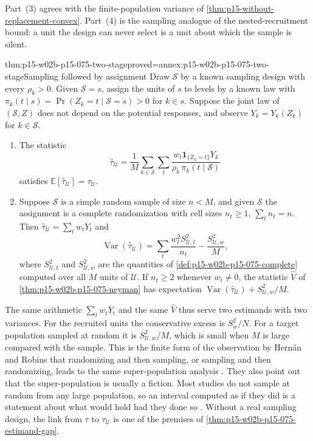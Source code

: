 Part~(3) agrees with the finite-population variance of
\cref{thm:p15-without-replacement-convex}. Part~(4) is the sampling analogue of
the nested-recruitment bound: a unit the design can never select is a unit
about which the sample is silent.

\begin{hbtheorem}{thm:p15-w02b-p15-075-two-stage}{proved=annex:p15-w02b-p15-075-two-stage}{Sampling followed by assignment}
Draw \(\mathcal S\) by a known sampling design with every \(\rho_k>0\).
Given \(\mathcal S=s\), assign the units of \(s\) to levels by a known law with
\(\pi_k(t\mid s)=\Pr(Z_k=t\mid\mathcal S=s)>0\) for \(k\in s\). Suppose the
joint law of \((\mathcal S,Z)\) does not depend on the potential responses, and
observe \(Y_k=Y_k(Z_k)\) for \(k\in\mathcal S\).
\begin{enumerate}
\item The statistic
\[
 \widehat\tau_{\mathcal U}=\frac1M\sum_{k\in\mathcal S}\sum_t
 \frac{w_t\mathbf1_{\{Z_k=t\}}Y_k}{\rho_k\,\pi_k(t\mid\mathcal S)}
\]
satisfies \(\mathbb E[\widehat\tau_{\mathcal U}]=\tau_{\mathcal U}\).
\item Suppose \(\mathcal S\) is a simple random sample of size \(n<M\), and
given \(\mathcal S\) the assignment is a complete randomization with cell sizes
\(n_t\geq1\), \(\sum_tn_t=n\). Then
\(\widehat\tau_{\mathcal U}=\sum_tw_t\overline Y_t\) and
\[
 \operatorname{Var}(\widehat\tau_{\mathcal U})
 =\sum_t\frac{w_t^2S_{\mathcal U,t}^2}{n_t}-\frac{S_{\mathcal U,w}^2}{M},
\]
where \(S_{\mathcal U,t}^2\) and \(S_{\mathcal U,w}^2\) are the quantities of
\cref{def:p15-w02b-p15-075-complete} computed over all \(M\) units of
\(\mathcal U\). If \(n_t\geq2\) whenever \(w_t\neq0\), the statistic
\(\widehat V\) of \cref{thm:p15-w02b-p15-075-neyman} has expectation
\(\operatorname{Var}(\widehat\tau_{\mathcal U})+S_{\mathcal U,w}^2/M\).
\end{enumerate}
\end{hbtheorem}

The same arithmetic \(\sum_tw_t\overline Y_t\) and the same \(\widehat V\)
thus serve two estimands with two variances. For the recruited units the
conservative excess is \(S_w^2/N\). For a target population sampled at random
it is \(S_{\mathcal U,w}^2/M\), which is small when \(M\) is large compared with
the sample. This is the finite form of the observation by Hern\'an and Robins
that randomizing and then sampling, or sampling and then randomizing, leads to
the same super-population analysis \cite[\S10.2, pp.~141--142]{HernanRobins2020WhatIf2026}.
They also point out that the super-population is usually a fiction. Most
studies do not sample at random from any large population, so an interval
computed as if they did is a statement about what would hold had they done so
\cite[\S10.3, pp.~142--144]{HernanRobins2020WhatIf2026}. Without a real
sampling design, the link from \(\tau\) to \(\tau_{\mathcal U}\) is one of the
premises of \cref{thm:p15-w02b-p15-075-estimand-gap}.


